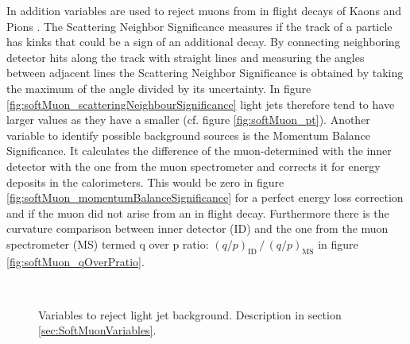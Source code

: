 In addition variables are used to reject muons from in flight decays of Kaons and Pions \citep{ATLAS-CONF-2020-030}. The Scattering Neighbor Significance measures if the track of a particle has kinks that could be a sign of an additional decay. By connecting neighboring detector hits along the track with straight lines and measuring the angles between adjacent lines the Scattering Neighbor Significance is obtained by taking the maximum of the angle divided by its uncertainty. In figure \ref{fig:softMuon_scatteringNeighbourSignificance} light jets therefore tend to have larger values as they have a smaller \pt (cf. figure \ref{fig:softMuon_pt}). Another variable to identify possible background sources is the Momentum Balance Significance. It calculates the difference of the muon-\pt determined with the inner detector with the one from the muon spectrometer and corrects it for energy deposits in the calorimeters. This would be zero in figure \ref{fig:softMuon_momentumBalanceSignificance} for a perfect energy loss correction and if the muon did not arise from an in flight decay. Furthermore there is the curvature comparison between inner detector (ID) and the one from the muon spectrometer (MS) termed q over p ratio: $(q/p)_\mathrm{ID}\, \bm{/}\, (q/p)_\mathrm{MS}$ in figure \ref{fig:softMuon_qOverPratio}. 

\begin{figure}[htbp]
  \centering
    \\
  \caption{Variables to reject light jet background. Description in section \ref{sec:SoftMuonVariables}.}
  \label{fig:softMuonVariables2}
\end{figure}


